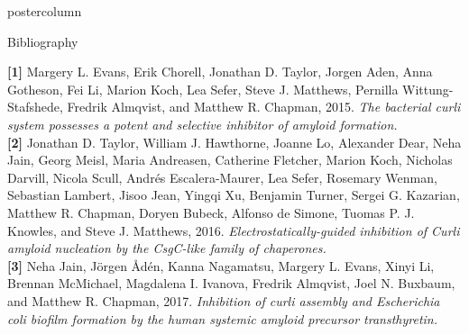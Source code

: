 \documentclass[final]{beamer}\usepackage[]{graphicx}\usepackage[]{color}
\begin{document}
\begin{frame}
\begin{columns}
\begin{column}{.47\textwidth}
\begin{beamercolorbox}[center,wd=\textwidth]{postercolumn}
\begin{minipage}[T]{.99\textwidth}
{\begin{block}{Bibliography}
\small{
\justify 
\textbf{[1]} Margery L. Evans, Erik Chorell, Jonathan D. Taylor, Jorgen Aden, Anna Gotheson, Fei Li, Marion Koch, Lea Sefer, Steve J. Matthews, Pernilla Wittung-Stafshede, Fredrik Almqvist, and Matthew R. Chapman, 2015. \textit{The bacterial curli system possesses a potent and selective inhibitor of amyloid formation.} 
\\
\textbf{[2]} Jonathan D. Taylor, William J. Hawthorne, Joanne Lo, Alexander Dear, Neha Jain, Georg Meisl, Maria Andreasen, Catherine Fletcher, Marion Koch, Nicholas Darvill, Nicola Scull, Andrés Escalera-Maurer, Lea Sefer, Rosemary Wenman, Sebastian Lambert, Jisoo Jean, Yingqi Xu, Benjamin Turner, Sergei G. Kazarian, Matthew R. Chapman, Doryen Bubeck, Alfonso de Simone, Tuomas P. J. Knowles, and Steve J. Matthews, 2016. \textit{Electrostatically-guided inhibition of Curli amyloid nucleation by the CsgC-like family of chaperones.} 
\\
\textbf{[3]} Neha Jain, Jörgen Ådén, Kanna Nagamatsu, Margery L. Evans, Xinyi Li, Brennan McMichael, Magdalena I. Ivanova, Fredrik Almqvist, Joel N. Buxbaum, and Matthew R. Chapman, 2017. \textit{Inhibition of curli assembly and Escherichia coli biofilm formation by the human systemic amyloid precursor transthyretin.}

}

\end{block}


}
\end{minipage}
\end{beamercolorbox}
\end{column}
\end{columns}  
\end{frame}
\end{document}
